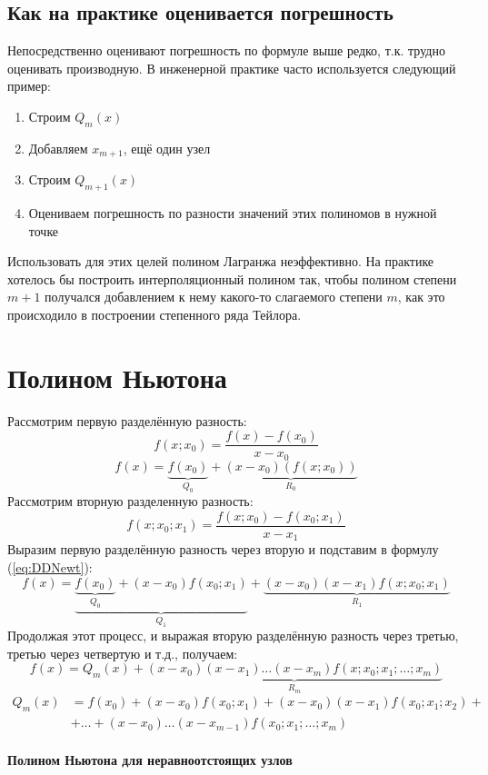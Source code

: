 \documentclass[a4paper,11pt]{article}
\begin{document}
  \subsection{Как на практике оценивается погрешность}
  Непосредственно оценивают погрешность по формуле выше редко, т.к. трудно оценивать производную. В инженерной практике часто используется следующий пример:
  \begin{enumerate}
    \item Строим $Q_m(x)$
    \item Добавляем $x_{m+1}$, ещё один узел
    \item Строим $Q_{m+1}(x)$
    \item Оцениваем погрешность по разности значений этих полиномов в нужной точке
  \end{enumerate}
  Использовать для этих целей полином Лагранжа неэффективно. На практике хотелось бы построить интерполяционный полином так, чтобы полином степени $m+1$
  получался добавлением к нему какого-то слагаемого степени $m$, как это происходило в построении степенного ряда Тейлора.

\section{Полином Ньютона}
Рассмотрим первую разделённую разность:
\[f(x; x_0) = \frac{f(x) - f(x_0)}{x - x_0}\]
\begin{equation}
  f(x) = \underbrace{f(x_0)}_{Q_0} + \underbrace{(x - x_0)(f(x; x_0))}_{R_0}
  \label{eq:DDNewt}
\end{equation}
Рассмотрим вторную разделенную разность:
\[f(x; x_0; x_1) = \frac{f(x; x_0) - f(x_0; x_1)}{x - x_1}\]
Выразим первую разделённую разность через вторую и подставим в формулу (\ref{eq:DDNewt}):
\[f(x) = \underbrace{\underbrace{f(x_0)}_{Q_0} + (x - x_0)f(x_0; x_1)}_{Q_1} + \underbrace{(x - x_0)(x - x_1)f(x; x_0; x_1)}_{R_1}\]
Продолжая этот процесс, и выражая вторую разделённую разность через третью, третью через четвертую и т.д., получаем:
\[f(x) = Q_m(x) + \underbrace{(x - x_0)(x - x_1)\dots(x - x_m)f(x; x_0; x_1; \dots; x_m)}_{R_m}\]
\vspace{10mm}
\begin{equation}
  \begin{aligned}
    Q_m(x) &= f(x_0) + (x - x_0)f(x_0; x_1)+(x - x_0)(x - x_1)f(x_0; x_1; x_2) +\\
          & + \dots + (x - x_0)\dots(x - x_{m-1})f(x_0; x_1; \dots; x_m) \\
  \end{aligned}
  \label{eq:GenNewtPol}
\end{equation}
\begin{center}
  \textbf{Полином Ньютона для неравноотстоящих узлов}
\end{center}
\end{document}
